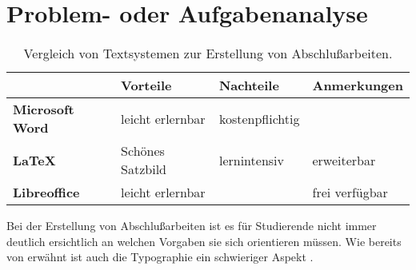 \documentclass[11pt,        %
  english,ngerman,          %
  paper=a4,                 %
  captions=tablesignature,  %
  listof=numbered,          %
  bibliography=totoc,       %
  headings=small,           %
  headinclude=false,        %
  footinclude=false,        %
  parskip=half-,            %
  oneside,                  %
  BCOR=15mm,                 %
  DIV=12                    %
  ]{scrbook}                %
\begin{document}
\section{Problem- oder Aufgabenanalyse}\label{sec:problem_ana}


\begin{table}[ht]
  \renewcommand{\tabcolsep}{3mm}
  \renewcommand{\arraystretch}{1.5}
  \begin{center}
    \begin{tabular}{llll}
                              & \textbf{Vorteile}  & \textbf{Nachteile} & \textbf{Anmerkungen}\\
      \hline
      \textbf{Microsoft Word} & leicht erlernbar   & kostenpflichtig    & \\
      \textbf{\LaTeX}         & Schönes Satzbild   & lernintensiv       & erweiterbar \\
      \textbf{Libreoffice}    & leicht erlernbar   &                    & frei verfügbar \\
    \end{tabular}
    \caption{Vergleich von Textsystemen zur Erstellung von Abschlußarbeiten.}
    \label{table:typesetting}
  \end{center}
\end{table}%

Bei der Erstellung von Abschlußarbeiten ist es für Studierende nicht immer deutlich ersichtlich
an welchen Vorgaben sie sich orientieren müssen. Wie bereits von \citet[Seite 19]{bringhurst-2005-elements_typographic_style} erwähnt ist auch die Typographie ein schwieriger Aspekt \citep{willberg-2008-wegweiser_schrift}.
\end{document}
